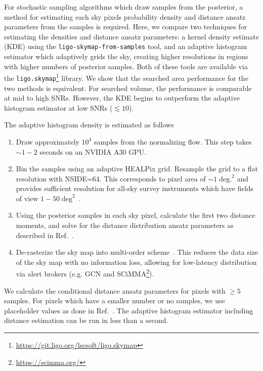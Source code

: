 \begin{refsection}
For stochastic sampling algorithms which draw samples from the posterior, a method for estimating each sky pixels probability density and distance ansatz parameters from the samples is required. 
Here, we compare two techniques for estimating the densities and distance ansatz parameters: a kernel density estimate (KDE) using the \texttt{ligo-skymap-from-samples} tool, and an adaptive histogram estimator which adaptively grids the sky, creating higher resolutions in regions with higher numbers of posterior samples. 
Both of these tools are available via the \texttt{ligo.skymap}\footnote{\url{https://git.ligo.org/lscsoft/ligo.skymap}} library. 
We show that the searched area performance for the two methods is equivalent. 
For searched volume, the performance is comparable at mid to high SNRs. 
However, the KDE begins to outperform the adaptive histogram estimator at low SNRs ($\lesssim 10$). 


The adaptive histogram density is estimated as follows

\begin{enumerate}
    \item Draw approximately $10^4$ samples from the normalizing flow. 
    This step takes $\sim 1-2$ seconds on an NVIDIA A30 GPU.
    \item Bin the samples using an adaptive HEALPix grid. 
    Resample the grid to a flat resolution with NSIDE=64.
    This corresponds to pixel area of $\sim 1\;\mathrm{deg.}^2$ and provides sufficient resolution for all-sky survey instruments which have fields of view $1-50\;\mathrm{deg}^2$~\cite{andreoni2024rubin2024envisioningvera, Bellm_2018}.
    \item Using the posterior samples in each sky pixel, calculate the first two distance moments, and solve for the distance distribution ansatz parameters as described in Ref.~\cite{Singer_2016}.
    \item De-rasterize the sky map into multi-order scheme~\cite{Fernique}. 
    This reduces the data size of the sky map with no information loss, allowing for low-latency distribution via alert brokers (e.g. GCN and SCiMMA\footnote{\url{https://scimma.org/}}).
\end{enumerate}
We calculate the conditional distance ansatz parameters for pixels with $\geq 5$ samples. 
For pixels which have a smaller number or no samples, we use placeholder values as done in Ref.~\cite{Singer_2016}. 
The adaptive histogram estimator including distance estimation can be run in less than a second.


\end{refsection}
